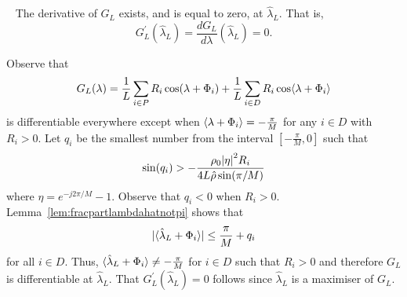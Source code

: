 \documentclass[journal]{IEEEtran}
\begin{document}



\begin{lemma}~\label{lem:diffatlambdaL}
The derivative of $G_L$ exists, and is equal to zero, at $\hat{\lambda}_L$.  That is,
\[
G_L^\prime(\hat{\lambda}_L) = \frac{d G_L}{d \lambda}(\hat{\lambda}_L) = 0.
\]
\end{lemma}
\begin{IEEEproof}
Observe that 
\[
G_L(\lambda) = \frac{1}{L}\sum_{i \in P} R_i \cos(\lambda + \Phi_i) + \frac{1}{L} \sum_{i \in D} R_i \cos\langle \lambda + \Phi_i \rangle
\] 
is differentiable everywhere except when $\left\langle \lambda + \Phi_i \right\rangle = -\tfrac{\pi}{M}$ for any $i \in D$ with $R_i > 0$.  Let $q_i$ be the smallest number from the interval $[-\tfrac{\pi}{M}, 0]$ such that
\[
 \sin(q_i) > -\frac{\rho_0 {\vert \eta \vert}^2 R_i}{4 L \hat{\rho} \sin(\pi/M)}
\]
where $\eta = e^{-j2\pi/M} - 1$.  Observe that $q_i < 0$ when $R_i > 0$.  Lemma~\ref{lem:fracpartlambdahatnotpi} shows that
\[
{\vert \langle \hat{\lambda}_L + \Phi_i \rangle \vert} \leq \frac{\pi}{M} + q_i
\]
for all $i \in D$.  Thus, $\langle \hat{\lambda}_L + \Phi_i \rangle \neq -\tfrac{\pi}{M}$ for $i \in D$ such that $R_i > 0$ and therefore $G_L$ is differentiable at $\hat{\lambda}_L$.  That $G_L^\prime(\hat{\lambda}_L) = 0$ follows since $\hat{\lambda}_L$ is a maximiser of $G_L$.
\end{IEEEproof}
\end{document}
